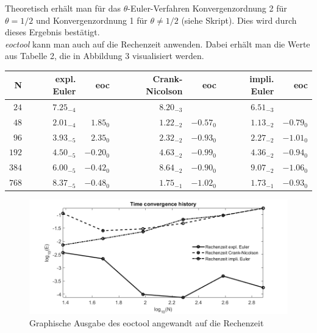 \documentclass[11pt,a4paper]{article}
\begin{document}
Theoretisch erh\"alt man f\"ur das $\theta$-Euler-Verfahren Konvergenzordnung 2 f\"ur $\theta=1/2$ und Konvergenzordnung 1 f\"ur $\theta\neq1/2$ (siehe Skript). Dies wird durch dieses Ergebnis best\"atigt.\\

\textit{eoctool} kann man auch auf die Rechenzeit anwenden. Dabei erh\"alt man die Werte aus Tabelle 2, die in Abbildung 3 visualisiert werden.\\



\def\EntryA{N}%
\def\EntryB{expl. Euler}%
\def\EntryC{eoc}%
\def\EntryD{Crank-Nicolson}%
\def\EntryE{eoc}%
\def\EntryF{impli. Euler}%
\def\EntryG{eoc}%
\def\dec#1{{}_{#1}}%


\begin{tabular}{|r|r|r|r|r|r|r|}
\hline
\EntryA&\EntryB&\EntryC&\EntryD&\EntryE&\EntryF&\EntryG\\
\hline
$  24$ & $ 7.25\dec{-4}$ & & $ 8.20\dec{-3}$ & & $ 6.51\dec{-3}$ &\\ 
$  48$ & $ 2.01\dec{-4}$ & $ 1.85\dec{ 0}$ & $ 1.22\dec{-2}$ & $-0.57\dec{ 0}$ & $ 1.13\dec{-2}$ & $-0.79\dec{ 0}$\\ 
$  96$ & $ 3.93\dec{-5}$ & $ 2.35\dec{ 0}$ & $ 2.32\dec{-2}$ & $-0.93\dec{ 0}$ & $ 2.27\dec{-2}$ & $-1.01\dec{ 0}$\\ 
$ 192$ & $ 4.50\dec{-5}$ & $-0.20\dec{ 0}$ & $ 4.63\dec{-2}$ & $-0.99\dec{ 0}$ & $ 4.36\dec{-2}$ & $-0.94\dec{ 0}$\\ 
$ 384$ & $ 6.00\dec{-5}$ & $-0.42\dec{ 0}$ & $ 8.64\dec{-2}$ & $-0.90\dec{ 0}$ & $ 9.07\dec{-2}$ & $-1.06\dec{ 0}$\\ 
$ 768$ & $ 8.37\dec{-5}$ & $-0.48\dec{ 0}$ & $ 1.75\dec{-1}$ & $-1.02\dec{ 0}$ & $ 1.73\dec{-1}$ & $-0.93\dec{ 0}$\\ 
\hline
\end{tabular}
\begin{figure}
	\includegraphics[width=\textwidth]{Bild3}
     \caption{Graphische Ausgabe des eoctool angewandt auf die Rechenzeit}
\end{figure}
\end{document}
